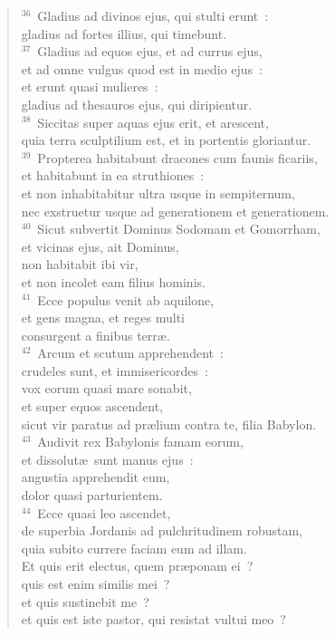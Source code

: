 \begin{verse}
${}^{36}$~Gladius ad divinos ejus, qui stulti erunt~:\\ gladius ad fortes illius, qui timebunt.\\
${}^{37}$~Gladius ad equos ejus, et ad currus ejus,\\ et ad omne vulgus quod est in medio ejus~:\\ et erunt quasi mulieres~:\\ gladius ad thesauros ejus, qui diripientur.\\
${}^{38}$~Siccitas super aquas ejus erit, et arescent,\\ quia terra sculptilium est, et in portentis gloriantur.\\
${}^{39}$~Propterea habitabunt dracones cum faunis ficariis,\\ et habitabunt in ea struthiones~:\\ et non inhabitabitur ultra usque in sempiternum,\\ nec exstruetur usque ad generationem et generationem.\\
${}^{40}$~Sicut subvertit Dominus Sodomam et Gomorrham,\\ et vicinas ejus, ait Dominus,\\ non habitabit ibi vir,\\ et non incolet eam filius hominis.\\
${}^{41}$~Ecce populus venit ab aquilone,\\ et gens magna, et reges multi\\ consurgent a finibus terr\ae .\\
${}^{42}$~Arcum et scutum apprehendent~:\\ crudeles sunt, et immisericordes~:\\ vox eorum quasi mare sonabit,\\ et super equos ascendent,\\ sicut vir paratus ad pr\ae lium contra te, filia Babylon.\\
${}^{43}$~Audivit rex Babylonis famam eorum,\\ et dissolut\ae\ sunt manus ejus~:\\ angustia apprehendit eum,\\ dolor quasi parturientem.\\
${}^{44}$~Ecce quasi leo ascendet,\\ de superbia Jordanis ad pulchritudinem robustam,\\ quia subito currere faciam eum ad illam.\\ Et quis erit electus, quem pr\ae ponam ei~?\\ quis est enim similis mei~?\\ et quis sustinebit me~?\\ et quis est iste pastor, qui resistat vultui meo~?\\

\end{verse}
